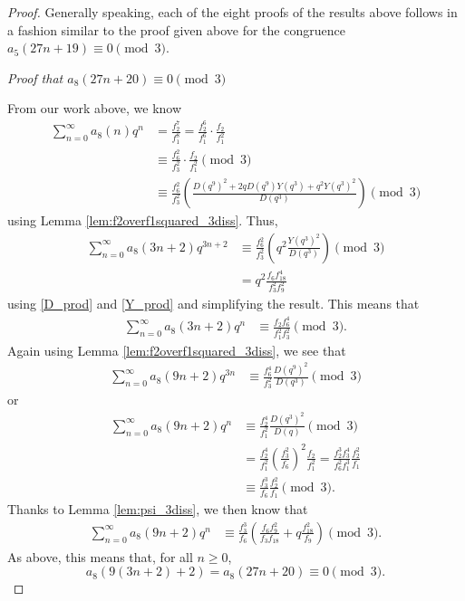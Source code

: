 \documentclass[10pt, reqno]{amsart}
\theoremstyle{theorem}
\theoremstyle{definition}
\theoremstyle{example}
\begin{document}
\begin{proof}
Generally speaking, each of the eight proofs of the results above follows in a fashion similar to the proof given above for the congruence $a_5(27n+19) \equiv 0 \pmod{3}$.  

\bigskip  

\noindent 
{\it Proof that $a_{8}(27n+20) \equiv 0 \pmod{3}$}

\bigskip 

\noindent 
From our work above, we know 
\begin{align*}
\sum_{n=0}^\infty a_8(n)q^n 
&= 
\frac{f_2^7}{f_1^8} = 
\frac{f_2^6}{f_1^6}\cdot \frac{f_2}{f_1^2} \\
&\equiv 
\frac{f_{6}^2}{f_3^2}\cdot \frac{f_2}{f_1^2} \pmod{3}  \\
&\equiv 
\frac{f_6^2}{f_3^2}\left( \frac{D(q^9)^2 +2qD(q^9)Y(q^3)+q^2Y(q^3)^2}{D(q^3)}  \right) \pmod{3} 
\end{align*}
using Lemma \ref{lem:f2overf1squared_3diss}.  
Thus, 
\begin{align*}
\sum_{n=0}^\infty a_8(3n+2)q^{3n+2} 
&\equiv 
\frac{f_6^2}{f_3^2}\left( q^2\frac{Y(q^3)^2}{D(q^3)}  \right) \pmod{3}  \\
&= 
q^2\frac{f_6f_{18}^4}{f_3^2f_9^2}
\end{align*}
using \eqref{D_prod} and \eqref{Y_prod} and simplifying the result.  This means that
\begin{align*}
\sum_{n=0}^\infty a_8(3n+2)q^{n} 
&\equiv 
\frac{f_2f_{6}^4}{f_1^2f_3^2} \pmod{3}.
\end{align*}
Again using Lemma \ref{lem:f2overf1squared_3diss}, we see that 
\begin{align*}
\sum_{n=0}^\infty a_8(9n+2)q^{3n} 
&\equiv 
\frac{f_6^4}{f_3^2} \frac{D(q^9)^2}{D(q^3)} \pmod{3}
\end{align*}
or 
\begin{align*}
\sum_{n=0}^\infty a_8(9n+2)q^{n} 
&\equiv 
\frac{f_2^4}{f_1^2} \frac{D(q^3)^2}{D(q)} \pmod{3} \\
&= 
\frac{f_2^4}{f_1^2} \left(\frac{f_3^2}{f_6}\right)^2\frac{f_2}{f_1^2} 
= 
\frac{f_2^3f_3^4}{f_6^2f_1^3}\frac{f_2^2}{f_1} \\
&\equiv 
\frac{f_3^3}{f_6}\frac{f_2^2}{f_1} \pmod{3}.
\end{align*}
Thanks to Lemma \ref{lem:psi_3diss}, we then know that 
\begin{align*}
\sum_{n=0}^\infty a_8(9n+2)q^{n} 
&\equiv 
\frac{f_3^3}{f_6}\left( \frac{f_6f_9^2}{f_3f_{18}} +q\frac{f_{18}^2}{f_9} \right) \pmod{3}.
\end{align*}
As above, this means that, for all $n\geq 0$, 
\begin{equation*}
\label{27n19_mod3} 
a_8(9(3n+2)+2) = a_8(27n+20) \equiv 0 \pmod{3}. 
\end{equation*}


\end{proof}
\end{document}
